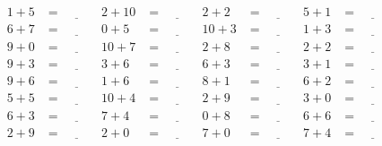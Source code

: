 \documentclass{article}
\begin{document}
\begin{sloppy}
\begin{align*}
    1 + 5 &= \underline{\hspace{1cm}} & 2 + 10 &= \underline{\hspace{1cm}} & 2 + 2 &= \underline{\hspace{1cm}} & 5 + 1 &= \underline{\hspace{1cm}} \\
    6 + 7 &= \underline{\hspace{1cm}} & 0 + 5 &= \underline{\hspace{1cm}} & 10 + 3 &= \underline{\hspace{1cm}} & 1 + 3 &= \underline{\hspace{1cm}} \\
    9 + 0 &= \underline{\hspace{1cm}} & 10 + 7 &= \underline{\hspace{1cm}} & 2 + 8 &= \underline{\hspace{1cm}} & 2 + 2 &= \underline{\hspace{1cm}} \\
    9 + 3 &= \underline{\hspace{1cm}} & 3 + 6 &= \underline{\hspace{1cm}} & 6 + 3 &= \underline{\hspace{1cm}} & 3 + 1 &= \underline{\hspace{1cm}} \\
    9 + 6 &= \underline{\hspace{1cm}} & 1 + 6 &= \underline{\hspace{1cm}} & 8 + 1 &= \underline{\hspace{1cm}} & 6 + 2 &= \underline{\hspace{1cm}} \\
    5 + 5 &= \underline{\hspace{1cm}} & 10 + 4 &= \underline{\hspace{1cm}} & 2 + 9 &= \underline{\hspace{1cm}} & 3 + 0 &= \underline{\hspace{1cm}} \\
    6 + 3 &= \underline{\hspace{1cm}} & 7 + 4 &= \underline{\hspace{1cm}} & 0 + 8 &= \underline{\hspace{1cm}} & 6 + 6 &= \underline{\hspace{1cm}} \\
    2 + 9 &= \underline{\hspace{1cm}} & 2 + 0 &= \underline{\hspace{1cm}} & 7 + 0 &= \underline{\hspace{1cm}} & 7 + 4 &= \underline{\hspace{1cm}} \\

\end{align*}
\end{sloppy}
\end{document}
